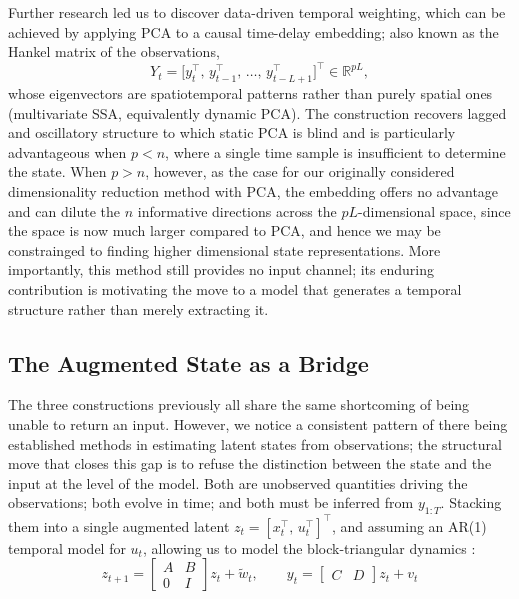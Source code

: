 \documentclass[11pt,a4paper]{article}
\begin{document}
Further research led us to discover data-driven temporal weighting, which can be achieved by applying PCA to a causal time-delay embedding; also known as the Hankel matrix of the observations,
\begin{equation}
Y_t = \bigl[y_t^\top,\, y_{t-1}^\top,\, \ldots,\, y_{t-L+1}^\top\bigr]^\top \in \mathbb{R}^{pL},
\end{equation}
whose eigenvectors are spatiotemporal patterns rather than purely spatial ones (multivariate SSA, equivalently dynamic PCA). The construction recovers lagged and oscillatory structure to which static PCA is blind and is particularly advantageous when $p < n$, where a single time sample is insufficient to determine the state. When $p > n$, however, as the case for our originally considered dimensionality reduction method with PCA, the embedding offers no advantage and can dilute the $n$ informative directions across the $pL$-dimensional space, since the space is now much larger compared to PCA, and hence we may be constrainged to finding higher dimensional state representations.
More importantly, this method still provides no input channel; its enduring contribution is motivating the move to a model that generates a temporal structure rather than merely extracting it. 

\subsection{The Augmented State as a Bridge}
 
The three constructions previously all share the same shortcoming of being unable to return an input. However, we notice a consistent pattern of there being established methods in estimating latent states from observations; the structural move that closes this gap is to refuse the distinction between the state and the input at the level of the model. Both are unobserved quantities driving the observations; both evolve in time; and both must be inferred from $y_{1:T}$. Stacking them into a single augmented latent $z_t = [x_t^\top,\, u_t^\top]^\top$, and assuming an AR(1) temporal model for $u_t$, allowing us to model the block-triangular dynamics :
\begin{equation}
z_{t+1} = \begin{bmatrix} A & B \\ 0 & I \end{bmatrix} z_t + \tilde{w}_t, \qquad y_t = \begin{bmatrix} C & D \end{bmatrix} z_t + v_t
\end{equation}
\end{document}
